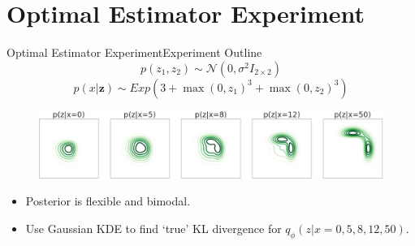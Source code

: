 \documentclass[handout]{beamer}
\begin{document}
\section{Optimal Estimator Experiment}
\begin{frame}{Optimal Estimator Experiment}{Experiment Outline}
\[p(z_1,z_2)\sim \mathcal{N} (0,\sigma^2 I_{2\times 2})\]
\[p(x|\bm{z})\sim Exp(3+\max(0,z_1)^3+\max(0,z_2)^3)\]
\begin{figure}[h]
\includegraphics[width=\textwidth]{sprinklertrue.png}
\end{figure}
\begin{itemize}
\item Posterior is flexible and bimodal.
\item Use Gaussian KDE to find `true' KL divergence for $q_\phi(z|x=0,5,8,12,50)$.
\end{itemize}
\end{frame}
\end{document}
